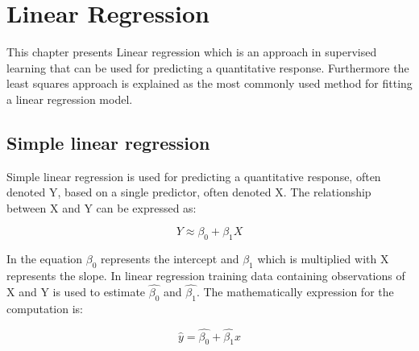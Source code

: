 \chapter{Linear Regression}
\label{chp:linreg}


This chapter presents Linear regression which is an approach in supervised learning that can be used for predicting a quantitative response. Furthermore the least squares approach is explained as the most commonly used method for fitting a linear regression model.

\section{Simple linear regression}

Simple linear regression is used for predicting a quantitative response, often denoted Y, based on a single predictor, often denoted X.
The relationship between X and Y can be expressed as:

\begin{equation}
Y \approx \beta_0 + \beta_1X
\end{equation}

In the equation $\beta_0$ represents the intercept and $\beta_1$ which is multiplied with X represents the slope.
In linear regression training data containing observations of X and Y is used to estimate $\hat{\beta_0}$ and $\hat{\beta_1}$. 
The mathematically expression for the computation is:

\begin{equation}
\hat{y} = \hat{\beta_0} + \hat{\beta_1}x
\end{equation}

